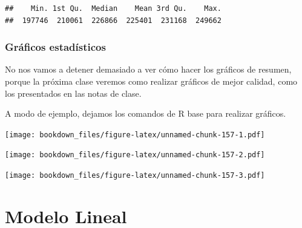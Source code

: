 \documentclass[]{book}
\newenvironment{Shaded}{\begin{snugshade}}{\end{snugshade}}
\newcommand{\KeywordTok}[1]{\textcolor[rgb]{0.13,0.29,0.53}{\textbf{#1}}}
\newcommand{\NormalTok}[1]{#1}
\newcommand{\OperatorTok}[1]{\textcolor[rgb]{0.81,0.36,0.00}{\textbf{#1}}}
\begin{document}
\begin{verbatim}
##    Min. 1st Qu.  Median    Mean 3rd Qu.    Max. 
##  197746  210061  226866  225401  231168  249662
\end{verbatim}

\hypertarget{graficos-estadisticos-1}{%
\subsection{Gráficos estadísticos}\label{graficos-estadisticos-1}}

No nos vamos a detener demasiado a ver cómo hacer los gráficos de resumen, porque la próxima clase veremos como realizar gráficos de mejor calidad, como los presentados en las notas de clase.

A modo de ejemplo, dejamos los comandos de R base para realizar gráficos.

\begin{Shaded}
\end{Shaded}

\texttt{[image: bookdown\_files/figure-latex/unnamed-chunk-157-1.pdf]}

\begin{Shaded}
\end{Shaded}

\texttt{[image: bookdown\_files/figure-latex/unnamed-chunk-157-2.pdf]}

\begin{Shaded}
\end{Shaded}

\texttt{[image: bookdown\_files/figure-latex/unnamed-chunk-157-3.pdf]}

\hypertarget{modelo-lineal}{%
\chapter{Modelo Lineal}\label{modelo-lineal}}
\end{document}
